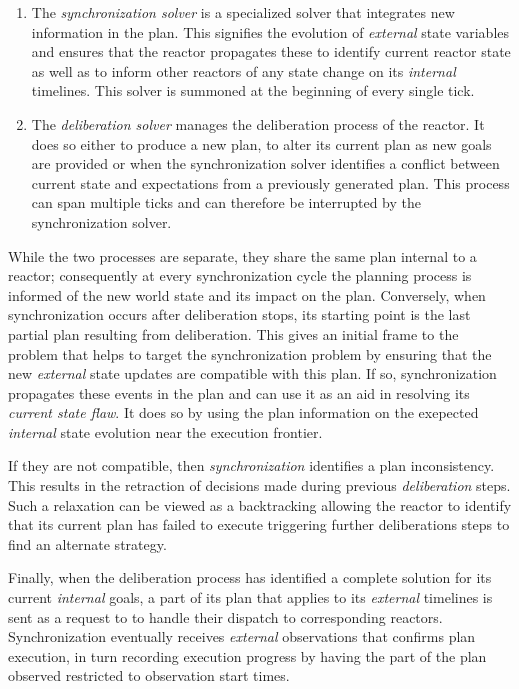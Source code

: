 \begin{enumerate}

\item The \emph{synchronization solver} is a specialized \eu solver
  that integrates new information in the plan. This signifies the
  evolution of \emph{external} state variables and ensures that the
  reactor propagates these to identify current reactor state as well
  as to inform other reactors of any state change on its
  \emph{internal} timelines. This solver is summoned at the beginning
  of every single tick.

\item The \emph{deliberation solver} manages the deliberation process
  of the reactor. It does so either to produce a new plan, to alter
  its current plan as new goals are provided or when the
  synchronization solver identifies a conflict between current state
  and expectations from a previously generated plan. This process can
  span multiple ticks and can therefore be interrupted by the
  synchronization solver.

\end{enumerate}

While the two processes are separate, they share the same plan
internal to a reactor; consequently at every synchronization cycle the
planning process is informed of the new world state and its impact on
the plan. Conversely, when synchronization occurs after deliberation
stops, its starting point is the last partial plan resulting from
deliberation. This gives an initial frame to the problem that helps to
target the synchronization problem by ensuring that the new {\em
  external} state updates are compatible with this plan. If so,
synchronization propagates these events in the plan and can use it as
an aid in resolving its {\em current state flaw}. It does so by using
the plan information on the exepected {\em internal} state evolution
near the execution frontier.

If they are not compatible, then {\em synchronization} identifies a
plan inconsistency. This results in the retraction of decisions made
during previous {\em deliberation} steps.  Such a relaxation can be
viewed as a backtracking allowing the reactor to identify that its
current plan has failed to execute triggering further deliberations
steps to find an alternate strategy.

Finally, when the deliberation process has identified a complete
solution for its current {\em internal} goals, a part of its plan that
applies to its {\em external} timelines is sent as a request to \rx to
handle their dispatch to corresponding reactors.  Synchronization
eventually receives {\em external } observations that confirms plan
execution, in turn recording execution progress by having the part of
the plan observed restricted to observation start times.


